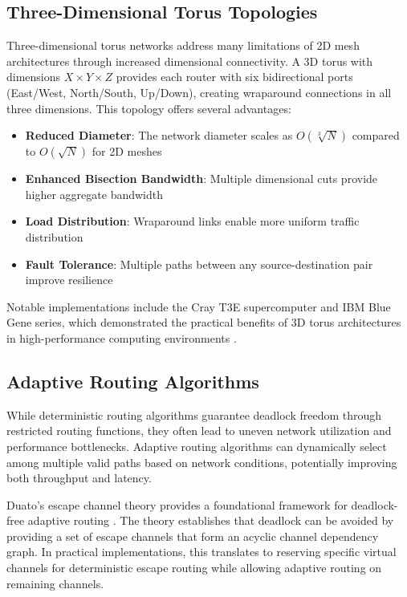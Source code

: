 \documentclass[a4paper,12pt]{article}
\begin{document}
\subsection{Three-Dimensional Torus Topologies}

Three-dimensional torus networks address many limitations of 2D mesh architectures through increased dimensional connectivity. A 3D torus with dimensions $X \times Y \times Z$ provides each router with six bidirectional ports (East/West, North/South, Up/Down), creating wraparound connections in all three dimensions. This topology offers several advantages:

\begin{itemize}
    \item \textbf{Reduced Diameter}: The network diameter scales as $O(\sqrt[3]{N})$ compared to $O(\sqrt{N})$ for 2D meshes
    \item \textbf{Enhanced Bisection Bandwidth}: Multiple dimensional cuts provide higher aggregate bandwidth
    \item \textbf{Load Distribution}: Wraparound links enable more uniform traffic distribution
    \item \textbf{Fault Tolerance}: Multiple paths between any source-destination pair improve resilience
\end{itemize}

Notable implementations include the Cray T3E supercomputer and IBM Blue Gene series, which demonstrated the practical benefits of 3D torus architectures in high-performance computing environments \cite{scott2006blackwidow}.

\subsection{Adaptive Routing Algorithms}

While deterministic routing algorithms guarantee deadlock freedom through restricted routing functions, they often lead to uneven network utilization and performance bottlenecks. Adaptive routing algorithms can dynamically select among multiple valid paths based on network conditions, potentially improving both throughput and latency.

Duato's escape channel theory provides a foundational framework for deadlock-free adaptive routing \cite{duato2002new}. The theory establishes that deadlock can be avoided by providing a set of escape channels that form an acyclic channel dependency graph. In practical implementations, this translates to reserving specific virtual channels for deterministic escape routing while allowing adaptive routing on remaining channels.
\end{document}
